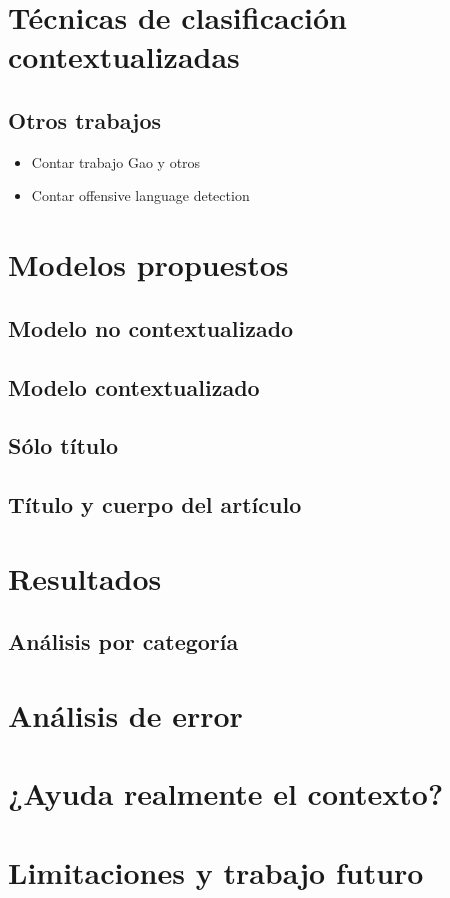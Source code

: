 \section{Técnicas de clasificación contextualizadas}

\subsection{Otros trabajos}

\begin{itemize}
    \item Contar trabajo Gao y otros
    \item Contar offensive language detection
\end{itemize}

\section{Modelos propuestos}

\subsection{Modelo no contextualizado}
\subsection{Modelo contextualizado}

\subsection{Sólo título}
\subsection{Título y cuerpo del artículo}

\section{Resultados}


\subsection{Análisis por categoría}

\section{Análisis de error}

\section{¿Ayuda realmente el contexto?}

\section{Limitaciones y trabajo futuro}